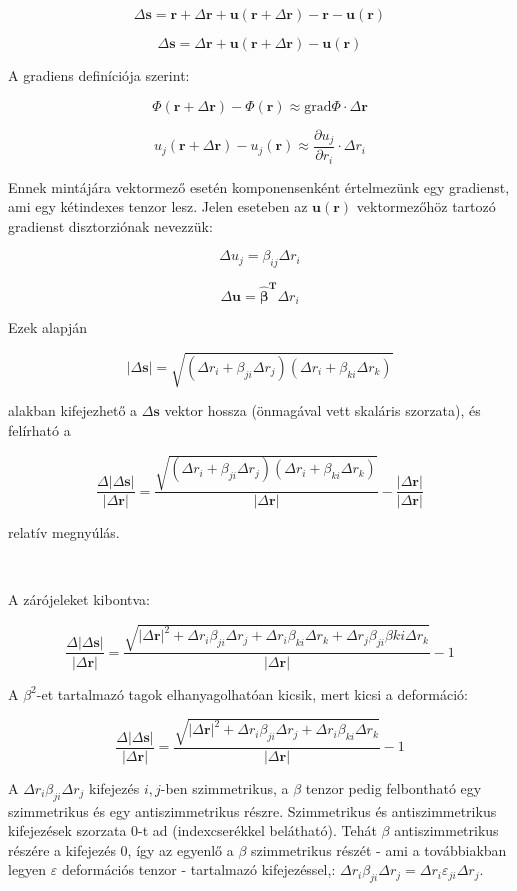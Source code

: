 \documentclass[a4paper, 12pt]{article}
\begin{document}
$$\Delta\mathbf{s}=\mathbf{r}+\Delta\mathbf{r}+\mathbf{u}(\mathbf{r}+\Delta\mathbf{r})-\mathbf{r}-\mathbf{u}(\mathbf{r})$$

$$\Delta\mathbf{s}=\Delta\mathbf{r}+\mathbf{u}(\mathbf{r}+\Delta\mathbf{r})-\mathbf{u}(\mathbf{r})$$

A gradiens definíciója szerint:

$$\Phi(\mathbf{r}+\Delta\mathbf{r})-\Phi(\mathbf{r})\approx \mathrm{grad}\Phi\cdot\Delta\mathbf{r}$$

$$u_j(\mathbf{r}+\Delta\mathbf{r})-u_j(\mathbf{r})\approx \frac{\partial u_j}{\partial r_i}\cdot\Delta r_i$$

Ennek mintájára vektormező esetén komponensenként értelmezünk egy gradienst, ami egy kétindexes tenzor lesz. Jelen eseteben az $\mathbf{u}(\mathbf{r})$ vektormezőhöz tartozó gradienst disztorziónak nevezzük:

$$\Delta u_j=\beta_{ij}\Delta r_i$$

$$\Delta \mathbf{u}=\mathbf{\hat\beta^{T}}\Delta r_i$$

Ezek alapján

$$|\Delta\mathbf{s}|=\sqrt{(\Delta r_i+\beta_{ji}\Delta r_j)(\Delta r_i+\beta_{ki}\Delta r_k)}$$

alakban kifejezhető a $\Delta\mathbf{s}$ vektor hossza (önmagával vett skaláris szorzata), és felírható a

$$\frac{\Delta|\Delta\mathbf{s}|}{|\Delta\mathbf{r}|}=\frac{\sqrt{(\Delta r_i+\beta_{ji}\Delta r_j)(\Delta r_i+\beta_{ki}\Delta r_k)}}{|\Delta\mathbf{r}|}-\frac{|\Delta\mathbf{r}|}{|\Delta\mathbf{r}|}$$

relatív megnyúlás. 

~

A zárójeleket kibontva:

$$\frac{\Delta|\Delta\mathbf{s}|}{|\Delta\mathbf{r}|}=\frac{\sqrt{|\Delta\mathbf{r}|^2+\Delta r_i\beta_{ji}\Delta r_j+\Delta r_i\beta_{ki}\Delta r_k+\Delta r_j\beta_{ji}\beta{ki}\Delta r_k}}{|\Delta\mathbf{r}|}-1$$

A $\beta^2$-et tartalmazó tagok elhanyagolhatóan kicsik, mert kicsi a deformáció:

$$\frac{\Delta|\Delta\mathbf{s}|}{|\Delta\mathbf{r}|}=\frac{\sqrt{|\Delta\mathbf{r}|^2+\Delta r_i\beta_{ji}\Delta r_j+\Delta r_i\beta_{ki}\Delta r_k}}{|\Delta\mathbf{r}|}-1$$

A $\Delta r_i\beta_{ji}\Delta r_j$ kifejezés $i,j$-ben szimmetrikus, a $\beta$ tenzor pedig felbontható egy szimmetrikus és egy antiszimmetrikus részre. Szimmetrikus és antiszimmetrikus kifejezések szorzata $0$-t ad (indexcserékkel belátható). Tehát $\beta$ antiszimmetrikus részére a kifejezés $0$, így az egyenlő a $\beta$ szimmetrikus részét - ami a továbbiakban legyen $\varepsilon$ deformációs tenzor - tartalmazó kifejezéssel,: $\Delta r_i\beta_{ji}\Delta r_j=\Delta r_i\varepsilon_{ji}\Delta r_j$. 
\end{document}
